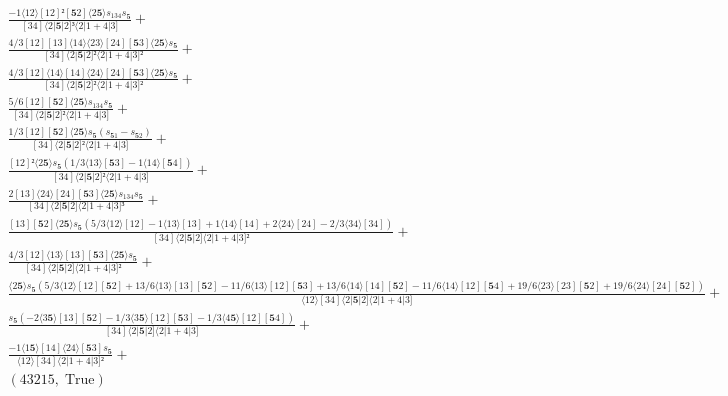 \documentclass[varwidth, border=5pt]{standalone}
\begin{document}
\begin{my}
$\begin{gathered}
\scriptscriptstyle\frac{-1⟨12⟩[12]²[𝟓2]⟨2𝟓⟩s_{134}s_{𝟓}}{[34]⟨2|𝟓|2]³⟨2|1+4|3]} +\\
\scriptscriptstyle\frac{4/3[12][13]⟨14⟩⟨23⟩[24][𝟓3]⟨2𝟓⟩s_{𝟓}}{[34]⟨2|𝟓|2]²⟨2|1+4|3]²} +\\
\scriptscriptstyle\frac{4/3[12]⟨14⟩[14]⟨24⟩[24][𝟓3]⟨2𝟓⟩s_{𝟓}}{[34]⟨2|𝟓|2]²⟨2|1+4|3]²} +\\
\scriptscriptstyle\frac{5/6[12][𝟓2]⟨2𝟓⟩s_{134}s_{𝟓}}{[34]⟨2|𝟓|2]²⟨2|1+4|3]} +\\
\scriptscriptstyle\frac{1/3[12][𝟓2]⟨2𝟓⟩s_{𝟓}(s_{𝟓1}-s_{𝟓2})}{[34]⟨2|𝟓|2]²⟨2|1+4|3]} +\\
\scriptscriptstyle\frac{[12]²⟨2𝟓⟩s_{𝟓}(1/3⟨13⟩[𝟓3]-1⟨14⟩[𝟓4])}{[34]⟨2|𝟓|2]²⟨2|1+4|3]} +\\
\scriptscriptstyle\frac{2[13]⟨24⟩[24][𝟓3]⟨2𝟓⟩s_{134}s_{𝟓}}{[34]⟨2|𝟓|2]⟨2|1+4|3]³} +\\
\scriptscriptstyle\frac{[13][𝟓2]⟨2𝟓⟩s_{𝟓}(5/3⟨12⟩[12]-1⟨13⟩[13]+1⟨14⟩[14]+2⟨24⟩[24]-2/3⟨34⟩[34])}{[34]⟨2|𝟓|2]⟨2|1+4|3]²} +\\
\scriptscriptstyle\frac{4/3[12]⟨13⟩[13][𝟓3]⟨2𝟓⟩s_{𝟓}}{[34]⟨2|𝟓|2]⟨2|1+4|3]²} +\\
\scriptscriptstyle\frac{⟨2𝟓⟩s_{𝟓}(5/3⟨12⟩[12][𝟓2]+13/6⟨13⟩[13][𝟓2]-11/6⟨13⟩[12][𝟓3]+13/6⟨14⟩[14][𝟓2]-11/6⟨14⟩[12][𝟓4]+19/6⟨23⟩[23][𝟓2]+19/6⟨24⟩[24][𝟓2])}{⟨12⟩[34]⟨2|𝟓|2]⟨2|1+4|3]} +\\
\scriptscriptstyle\frac{s_{𝟓}(-2⟨3𝟓⟩[13][𝟓2]-1/3⟨3𝟓⟩[12][𝟓3]-1/3⟨4𝟓⟩[12][𝟓4])}{[34]⟨2|𝟓|2]⟨2|1+4|3]} +\\
\scriptscriptstyle\frac{-1⟨1𝟓⟩[14]⟨24⟩[𝟓3]s_{𝟓}}{⟨12⟩[34]⟨2|1+4|3]²} +\\
\scriptscriptstyle(43215,\;\text{True}) \phantom{+}
\end{gathered}$
\end{my}
\end{document}

